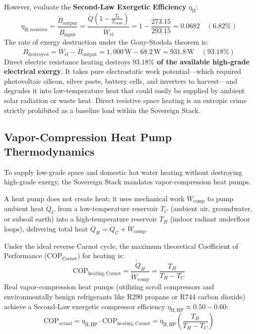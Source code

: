 However, evaluate the \textbf{Second-Law Exergetic Efficiency} $\eta_{\mathrm{II}}$:
\begin{equation}
\eta_{\mathrm{II, resistive}} = \frac{\dot{B}_{\mathrm{output}}}{\dot{B}_{\mathrm{input}}} = \frac{\dot{Q} \left(1 - \frac{T_0}{T_{\mathrm{room}}}\right)}{\dot{W}_{\mathrm{el}}} = 1 - \frac{273.15}{293.15} = 0.0682 \quad (6.82\%)
\label{eq:resistive_second_law_eff}
\end{equation}
The rate of exergy destruction under the Gouy-Stodola theorem is:
\begin{equation}
\dot{B}_{\mathrm{destroyed}} = \dot{W}_{\mathrm{el}} - \dot{B}_{\mathrm{output}} = 1,000\,\mathrm{W} - 68.2\,\mathrm{W} = 931.8\,\mathrm{W} \quad (93.18\%)
\label{eq:resistive_destruction_calc}
\end{equation}
Direct electric resistance heating destroys \textbf{$93.18\%$ of the available high-grade electrical exergy}. It takes pure electrostatic work potential---which required photovoltaic silicon, silver paste, battery cells, and inverters to harvest---and degrades it into low-temperature heat that could easily be supplied by ambient solar radiation or waste heat. Direct resistive space heating is an entropic crime strictly prohibited as a baseline load within the Sovereign Stack.

\subsection{Vapor-Compression Heat Pump Thermodynamics}
To supply low-grade space and domestic hot water heating without destroying high-grade exergy, the Sovereign Stack mandates vapor-compression heat pumps. 

A heat pump does not create heat; it uses mechanical work $\dot{W}_{\mathrm{comp}}$ to pump ambient heat $\dot{Q}_C$ from a low-temperature reservoir $T_C$ (ambient air, groundwater, or subsoil earth) into a high-temperature reservoir $T_H$ (indoor radiant underfloor loops), delivering total heat $\dot{Q}_H = \dot{Q}_C + \dot{W}_{\mathrm{comp}}$.

Under the ideal reverse Carnot cycle, the maximum theoretical Coefficient of Performance ($\mathrm{COP}_{\mathrm{Carnot}}$) for heating is:
\begin{equation}
\mathrm{COP}_{\mathrm{heating, Carnot}} = \frac{\dot{Q}_H}{\dot{W}_{\mathrm{comp}}} = \frac{T_H}{T_H - T_C}
\label{eq:carnot_cop_heating}
\end{equation}
Real vapor-compression heat pumps (utilizing scroll compressors and environmentally benign refrigerants like $\mathrm{R290}$ propane or $\mathrm{R744}$ carbon dioxide) achieve a Second-Law exergetic compressor efficiency $\eta_{\mathrm{II, HP}} \approx 0.50 - 0.60$:
\begin{equation}
\mathrm{COP}_{\mathrm{actual}} = \eta_{\mathrm{II, HP}} \cdot \mathrm{COP}_{\mathrm{heating, Carnot}} = \eta_{\mathrm{II, HP}} \left( \frac{T_H}{T_H - T_C} \right)
\label{eq:actual_cop_heating}
\end{equation}

